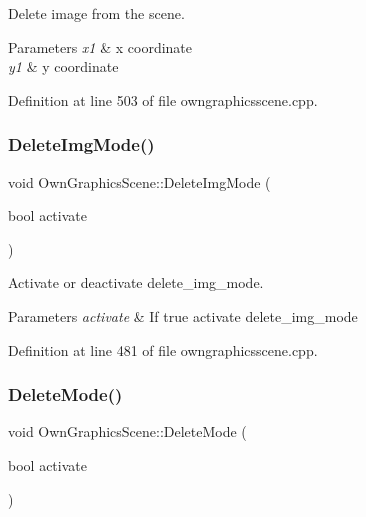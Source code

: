 Delete image from the scene. 


\begin{DoxyParams}{Parameters}
{\em x1} & x coordinate \\
\hline
{\em y1} & y coordinate \\
\hline
\end{DoxyParams}


Definition at line 503 of file owngraphicsscene.\+cpp.

\mbox{\label{classOwnGraphicsScene_aefe52a5b20dbb38dcc9d9510ecfabe52}} 
\subsubsection{\texorpdfstring{Delete\+Img\+Mode()}{DeleteImgMode()}}
{\footnotesize\ttfamily void Own\+Graphics\+Scene\+::\+Delete\+Img\+Mode (\begin{DoxyParamCaption}\item[{bool}]{activate }\end{DoxyParamCaption})}



Activate or deactivate delete\+\_\+img\+\_\+mode. 


\begin{DoxyParams}{Parameters}
{\em activate} & If true activate delete\+\_\+img\+\_\+mode \\
\hline
\end{DoxyParams}


Definition at line 481 of file owngraphicsscene.\+cpp.

\mbox{\label{classOwnGraphicsScene_aca454942ecf6c472d020e063862464d4}} 
\subsubsection{\texorpdfstring{Delete\+Mode()}{DeleteMode()}}
{\footnotesize\ttfamily void Own\+Graphics\+Scene\+::\+Delete\+Mode (\begin{DoxyParamCaption}\item[{bool}]{activate }\end{DoxyParamCaption})}




